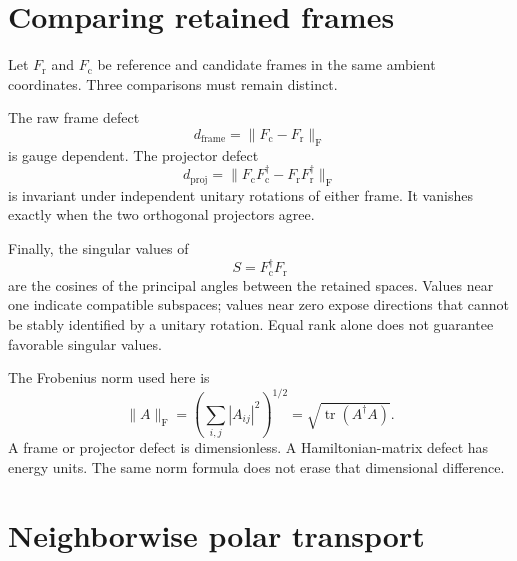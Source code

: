 \section{Comparing retained frames}

Let $F_{\mathrm r}$ and $F_{\mathrm c}$ be reference and candidate frames in
the same ambient coordinates. Three comparisons must remain distinct.

The raw frame defect
\begin{equation}
  d_{\mathrm{frame}}
  =\lVert F_{\mathrm c}-F_{\mathrm r}\rVert_{\mathrm F}
  \label{eq:training-composite-frame-defect}
\end{equation}
is gauge dependent. The projector defect
\begin{equation}
  d_{\mathrm{proj}}
  =\lVert
     F_{\mathrm c}F_{\mathrm c}^{\dagger}
     -F_{\mathrm r}F_{\mathrm r}^{\dagger}
   \rVert_{\mathrm F}
  \label{eq:training-composite-projector-defect}
\end{equation}
is invariant under independent unitary rotations of either frame. It vanishes
exactly when the two orthogonal projectors agree.

Finally, the singular values of
\begin{equation}
  S=F_{\mathrm c}^{\dagger}F_{\mathrm r}
  \label{eq:training-composite-frame-overlap}
\end{equation}
are the cosines of the principal angles between the retained spaces. Values
near one indicate compatible subspaces; values near zero expose directions
that cannot be stably identified by a unitary rotation. Equal rank alone does
not guarantee favorable singular values.

The Frobenius norm used here is
\begin{equation}
  \lVert A\rVert_{\mathrm F}
  =\left(\sum_{i,j}|A_{ij}|^2\right)^{1/2}
  =\sqrt{\operatorname{tr}(A^{\dagger}A)}.
  \label{eq:training-composite-frobenius}
\end{equation}
A frame or projector defect is dimensionless. A Hamiltonian-matrix defect has
energy units. The same norm formula does not erase that dimensional
difference.

\section{Neighborwise polar transport}

